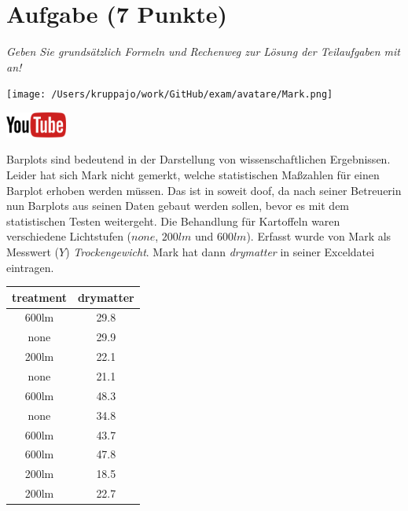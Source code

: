 \documentclass[a4paper, 9pt]{scrartcl}\usepackage[]{graphicx}\usepackage[]{xcolor}
\begin{document}
\section{Aufgabe \hfill (7 Punkte)}

\textit{Geben Sie grundsätzlich Formeln und Rechenweg zur Lösung der Teilaufgaben mit an!} \\[1Ex]
 

 
\begin{minipage}[t]{0.5\textwidth}
\texttt{[image: /Users/kruppajo/work/GitHub/exam/avatare/Mark.png]}
\end{minipage}
\begin{minipage}[t]{0.5\textwidth}
\hfill
\href{https://youtu.be/vXnLttRL_VI}{\includegraphics[width = 2cm]{img/youtube}}\\[1Ex]
\end{minipage}
\vspace{1ex}



Barplots sind bedeutend in der Darstellung von wissenschaftlichen Ergebnissen. Leider hat sich Mark nicht gemerkt, welche statistischen Maßzahlen für einen Barplot erhoben werden müssen. Das ist in soweit doof, da nach seiner Betreuerin nun Barplots aus seinen Daten gebaut werden sollen, bevor es mit dem statistischen Testen weitergeht. Die Behandlung für Kartoffeln waren verschiedene Lichtstufen ($none$, $200lm$ und $600lm$). Erfasst wurde von Mark als Messwert ($Y$) \textit{Trockengewicht}. Mark hat dann \textit{drymatter} in seiner Exceldatei eintragen.

\begin{table}[!h]
\centering
\begin{tabular}{cc}
\toprule
treatment & drymatter\\
\midrule
600lm & 29.8\\
none & 29.9\\
200lm & 22.1\\
none & 21.1\\
600lm & 48.3\\
\addlinespace
none & 34.8\\
600lm & 43.7\\
600lm & 47.8\\
200lm & 18.5\\
200lm & 22.7\\
\bottomrule
\end{tabular}
\end{table}
\end{document}
